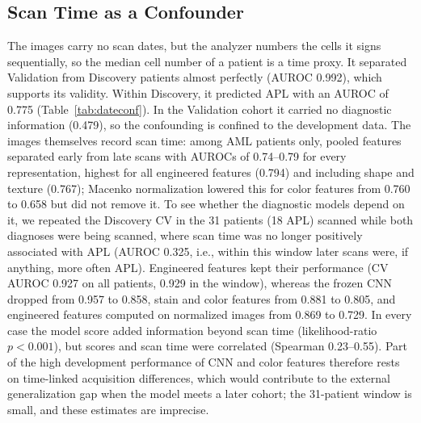 \documentclass[journal]{IEEEtran}
\begin{document}
\subsection{Scan Time as a Confounder}
\label{sec:date}
The images carry no scan dates, but the analyzer numbers the cells it signs sequentially, so the median cell number of a patient is a time proxy. It separated Validation from Discovery patients almost perfectly (AUROC 0.992), which supports its validity. Within Discovery, it predicted APL with an AUROC of 0.775 (Table~\ref{tab:dateconf}). In the Validation cohort it carried no diagnostic information (0.479), so the confounding is confined to the development data. The images themselves record scan time: among AML patients only, pooled features separated early from late scans with AUROCs of 0.74--0.79 for every representation, highest for all engineered features (0.794) and including shape and texture (0.767); Macenko normalization lowered this for color features from 0.760 to 0.658 but did not remove it. To see whether the diagnostic models depend on it, we repeated the Discovery CV in the 31 patients (18 APL) scanned while both diagnoses were being scanned, where scan time was no longer positively associated with APL (AUROC 0.325, i.e., within this window later scans were, if anything, more often APL). Engineered features kept their performance (CV AUROC 0.927 on all patients, 0.929 in the window), whereas the frozen CNN dropped from 0.957 to 0.858, stain and color features from 0.881 to 0.805, and engineered features computed on normalized images from 0.869 to 0.729. In every case the model score added information beyond scan time (likelihood-ratio $p<0.001$), but scores and scan time were correlated (Spearman 0.23--0.55). Part of the high development performance of CNN and color features therefore rests on time-linked acquisition differences, which would contribute to the external generalization gap when the model meets a later cohort; the 31-patient window is small, and these estimates are imprecise.


\end{document}
